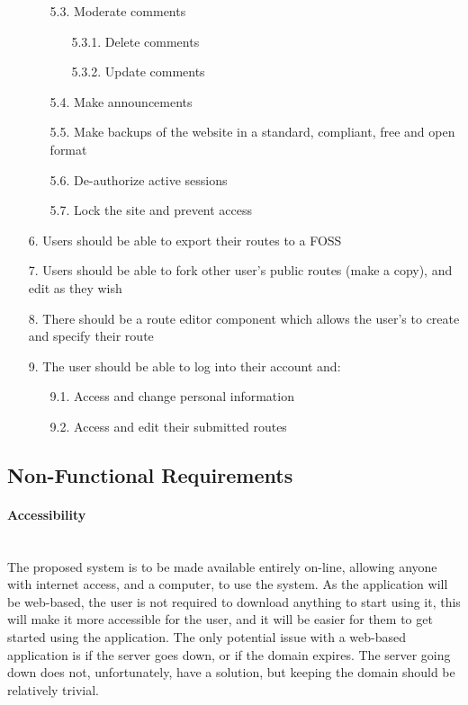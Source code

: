 \begin{enumerate}
\begin{enumerate}
 		\item[5.3.] Moderate comments
 		\begin{enumerate}
 			\item[5.3.1.] Delete comments
			\item[5.3.2.] Update comments
 		\end{enumerate}
 		\item[5.4.] Make announcements
 		\item[5.5.] Make backups of the website in a standard, compliant, free and open format
 		\item[5.6.] De-authorize active sessions
 		\item[5.7.] Lock the site and prevent access
 	\end{enumerate}
 \item[6.] Users should be able to export their routes to a FOSS
 \item[7.] Users should be able to fork other user's public routes (make a copy), and edit as they wish
 \item[8.] There should be a route editor component which allows the user's to create and specify their route
 \item[9.] The user should be able to log into their account and:
	 \begin{enumerate}
	 	\item[9.1.] Access and change personal information
	  	\item[9.2.] Access and edit their submitted routes
	 \end{enumerate}
 
 \end{enumerate}
 
 
 \subsection{Non-Functional Requirements}

\paragraph{Accessibility}\ \\
The proposed system is to be made available entirely on-line, allowing anyone with internet access, and a computer, to use the system. As the application will be web-based, the user is not required to download anything to start using it, this will make it more accessible for the user, and it will be easier for them to get started using the application. The only potential issue with a web-based application is if the server goes down, or if the domain expires. The server going down does not, unfortunately, have a solution, but keeping the domain should be relatively trivial.

